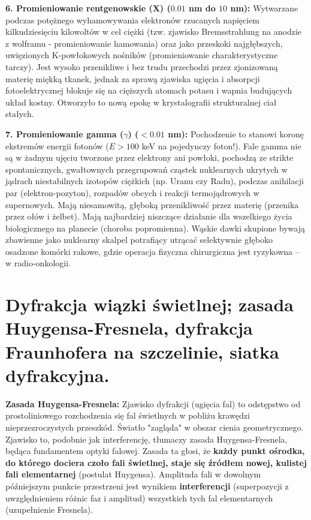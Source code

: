 \documentclass[11pt, a4paper]{article}
\begin{document}
\textbf{6. Promieniowanie rentgenowskie (X) ($0.01$ nm do $10$ nm):}
Wytwarzane podczas potężnego wyhamowywania elektronów rzucanych napięciem kilkudziesięciu kilowoltów w cel ciężki (tzw. zjawisko Bremsstrahlung na anodzie z wolframu - promieniowanie hamowania) oraz jako przeskoki najgłębszych, uwięzionych K-powłokowych nośników (promieniowanie charakterystyczne tarczy). Jest wysoko przenikliwe i bez trudu przechodzi przez zjonizowaną materię miękką tkanek, jednak za sprawą zjawiska ugięcia i absorpcji fotoelektrycznej blokuje się na cięższych atomach potasu i wapnia budujących układ kostny. Otworzyło to nową epokę w krystalografii strukturalnej ciał stałych.

\textbf{7. Promieniowanie gamma ($\gamma$) ($< 0.01$ nm):}
Pochodzenie to stanowi koronę ekstremów energii fotonów ($E > 100$ keV na pojedynczy foton!). Fale gamma nie są w żadnym ujęciu tworzone przez elektrony ani powłoki, pochodzą ze strikte spontanicznych, gwałtownych przegrupowań cząstek nuklearnych ukrytych w jądrach niestabilnych izotopów ciężkich (np. Uranu czy Radu), podczas anihilacji par (elektron-pozyton), rozpadów obcych i reakcji termojądrowych w supernowych. Mają niesamowitą, głęboką przenikliwość przez materię (przenika przez ołów i żelbet). Mają najbardziej niszczące działanie dla wszelkiego życia biologicznego na planecie (choroba popromienna). Wąskie dawki skupione bywają zbawienne jako nuklearny skalpel potrafiący utrącać selektywnie głęboko osadzone komórki rakowe, gdzie operacja fizyczna chirurgiczna jest ryzykowna – w radio-onkologii.

\section{Dyfrakcja wiązki świetlnej; zasada Huygensa-Fresnela, dyfrakcja Fraunhofera na szczelinie, siatka dyfrakcyjna.}

\textbf{Zasada Huygensa-Fresnela:}
Zjawisko dyfrakcji (ugięcia fal) to odstępstwo od prostoliniowego rozchodzenia się fal świetlnych w pobliżu krawędzi nieprzezroczystych przeszkód. Światło "zagląda" w obszar cienia geometrycznego. Zjawisko to, podobnie jak interferencję, tłumaczy zasada Huygensa-Fresnela, będąca fundamentem optyki falowej.
Zasada ta głosi, że \textbf{każdy punkt ośrodka, do którego dociera czoło fali świetlnej, staje się źródłem nowej, kulistej fali elementarnej} (postulat Huygensa). Amplituda fali w dowolnym późniejszym punkcie przestrzeni jest wynikiem \textbf{interferencji} (superpozycji z uwzględnieniem różnic faz i amplitud) wszystkich tych fal elementarnych (uzupełnienie Fresnela).
\end{document}
